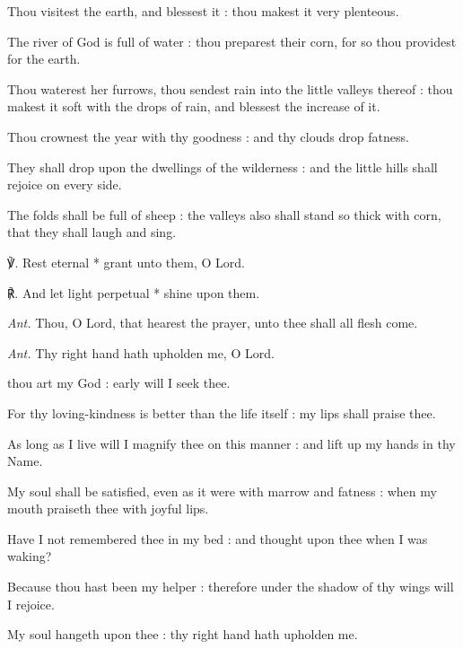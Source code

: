 Thou visitest the earth, and blessest it : thou makest it very plenteous.\par
{}The river of God is full of water : thou preparest their corn, for so thou providest for the earth.\par
{}Thou waterest her furrows, thou sendest rain into the little valleys thereof : thou makest it soft with the drops of rain, and blessest the increase of it.\par
{}Thou crownest the year with thy goodness : and thy clouds drop fatness.\par
{}They shall drop upon the dwellings of the wilderness : and the little hills shall rejoice on every side.\par
{}The folds shall be full of sheep : the valleys also shall stand so thick with corn, that they shall laugh and sing.\par
℣. Rest eternal * grant unto them, O Lord.\par
℟. And let light perpetual * shine upon them.\par\noindent
\textit{Ant.} Thou, O Lord, that hearest the prayer, unto thee shall all flesh come.\par
{}\par\noindent
\textit{Ant.} Thy right hand {\dag} hath upholden me, O Lord.\par
{} thou art my God : early will I seek thee.\par
{}
For thy loving-kindness is better than the life itself : my lips shall praise thee.\par
{}As long as I live will I magnify thee on this manner : and lift up my hands in thy Name.\par
{}My soul shall be satisfied, even as it were with marrow and fatness : when my mouth praiseth thee with joyful lips.\par
{}Have I not remembered thee in my bed : and thought upon thee when I was waking?\par
{}Because thou hast been my helper : therefore under the shadow of thy wings will I rejoice.\par
{}My soul hangeth upon thee : thy right hand hath upholden me.\par
